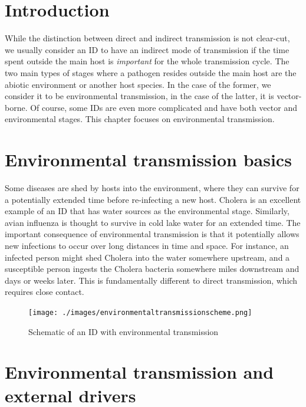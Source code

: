 \documentclass[
]{book}
\begin{document}
\hypertarget{introduction-6}{%
\section{Introduction}\label{introduction-6}}

While the distinction between direct and indirect transmission is not clear-cut, we usually consider an ID to have an indirect mode of transmission if the time spent outside the main host is \emph{important} for the whole transmission cycle. The two main types of stages where a pathogen resides outside the main host are the abiotic environment or another host species. In the case of the former, we consider it to be environmental transmission, in the case of the latter, it is vector-borne. Of course, some IDs are even more complicated and have both vector and environmental stages. This chapter focuses on environmental transmission.

\hypertarget{environmental-transmission-basics}{%
\section{Environmental transmission basics}\label{environmental-transmission-basics}}

Some diseases are shed by hosts into the environment, where they can survive for a potentially extended time before re-infecting a new host. Cholera is an excellent example of an ID that has water sources as the environmental stage. Similarly, avian influenza is thought to survive in cold lake water for an extended time. The important consequence of environmental transmission is that it potentially allows new infections to occur over long distances in time and space. For instance, an infected person might shed Cholera into the water somewhere upstream, and a susceptible person ingests the Cholera bacteria somewhere miles downstream and days or weeks later. This is fundamentally different to direct transmission, which requires close contact.

\begin{figure}
\centering
\texttt{[image: ./images/environmentaltransmissionscheme.png]}
\caption{Schematic of an ID with environmental transmission}
\end{figure}

\hypertarget{environmental-transmission-and-external-drivers}{%
\section{Environmental transmission and external drivers}\label{environmental-transmission-and-external-drivers}}
\end{document}
